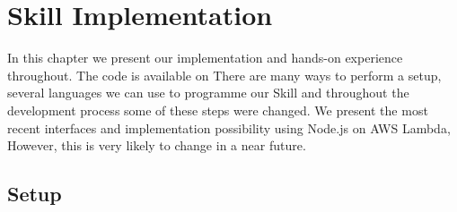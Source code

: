 \chapter{Skill Implementation}%
\label{maintwo}

In this chapter we present our implementation and hands-on experience throughout.
The code is available on 
There are many ways to perform a setup, several languages we can use to programme 
our Skill and throughout the development process some of these steps were changed. We present the most recent interfaces and implementation possibility using Node.js on AWS Lambda, However, this is very likely to change in a near future.

\section{Setup}




